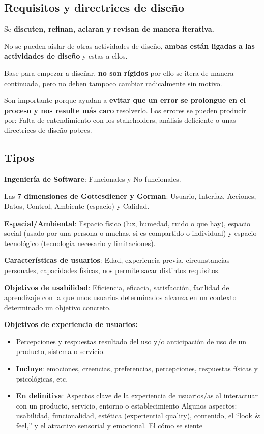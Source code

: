 \documentclass[12pt, twoside, openright]{report} %
\begin{document}
\subsection{Requisitos y directrices de diseño}

Se \textbf{discuten, refinan, aclaran y revisan de manera iterativa.}

No se pueden aislar de otras actividades de diseño, \textbf{ambas están
ligadas a las actividades de diseño} y estas a ellos.

Base para empezar a diseñar, \textbf{no son rígidos} por ello se itera
de manera continuada, pero no deben tampoco cambiar radicalmente sin
motivo.

Son importante porque ayudan a \textbf{evitar que un error se prolongue
en el proceso y nos resulte más caro} resolverlo. Los errores se pueden
producir por: Falta de entendimiento con los stakeholders, análisis
deficiente o unas directrices de diseño pobres.

\subsection{Tipos}

\textbf{Ingeniería de Software}: Funcionales y No funcionales.

Las \textbf{7 dimensiones de Gottesdiener y Gorman}: Usuario, Interfaz,
Acciones, Datos, Control, Ambiente (espacio) y Calidad.

\textbf{Espacial/Ambiental}: Espacio físico (luz, humedad, ruido o que
hay), espacio social (usado por una persona o muchas, si es compartido o
individual) y espacio tecnológico (tecnología necesario y limitaciones).

\textbf{Características de usuarios}: Edad, experiencia previa,
circunstancias personales, capacidades físicas, nos permite sacar
distintos requisitos.

\textbf{Objetivos de usabilidad}: Eficiencia, eficacia, satisfacción,
facilidad de aprendizaje con la que unos usuarios determinados alcanza en
un contexto determinado un objetivo concreto.

\textbf{Objetivos de experiencia de usuarios:}

\begin{itemize}

\item
  Percepciones y respuestas resultado del uso y/o anticipación de uso de
  un producto, sistema o servicio.
\item
\textbf{Incluye}: emociones, creencias, preferencias, percepciones, respuestas
  físicas y psicológicas, etc.
\item
\textbf{En definitiva}: Aspectos clave de la experiencia de usuarios/as al
  interactuar con un producto, servicio, entorno o establecimiento
  Algunos aspectos: usabilidad, funcionalidad, estética (experiential
  quality), contenido, el ``look \& feel,'' y el atractivo sensorial y
  emocional. El cómo se siente
\end{itemize}
\end{document}
